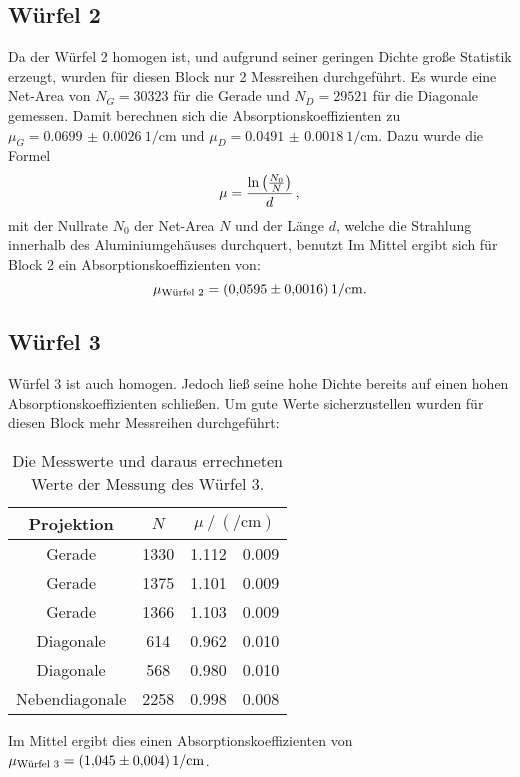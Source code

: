  \subsection{Würfel 2}
    Da der Würfel 2 homogen ist, und aufgrund seiner geringen Dichte große Statistik erzeugt, wurden für diesen Block nur 2 Messreihen durchgeführt.
    Es wurde eine Net-Area von $N_G=30323$ für die Gerade und $N_D=29521$ für die Diagonale gemessen.
    Damit berechnen sich die Absorptionskoeffizienten zu $\mu_G = \SI{0.0699(00026)}{1\per\centi\metre}$ und $\mu_D=\SI{0.0491(00018)}{1\per\centi\metre}$.
    Dazu wurde die Formel
    \begin{equation}
      \mu = \frac{\t{ln}\left(\frac{N_0}{N}\right)}{d} \, ,
    \end{equation}
    mit der Nullrate $N_0$ der Net-Area $N$ und der Länge $d$, welche die Strahlung innerhalb des Aluminiumgehäuses durchquert, benutzt
    Im Mittel ergibt sich für Block 2 ein Absorptionskoeffizienten von: 
    \begin{equation}
      \mu_\t{Würfel 2} = \SI{0.0595(00016)}{1\per\centi\metre}.
    \end{equation}

  \subsection{Würfel 3}
    Würfel 3 ist auch homogen. Jedoch ließ seine hohe Dichte bereits auf einen hohen Absorptionskoeffizienten schließen. 
    Um gute Werte sicherzustellen wurden für diesen Block mehr Messreihen durchgeführt:
    \begin{table}[H]
     \centering
     \caption{Die Messwerte und daraus errechneten Werte der Messung des Würfel 3.}
     \label{tab:w2}
     \begin{tabular}{c S[table-format=4.0] S[table-format=1.3] @{${}\pm{}$} S[table-format=1.3]}
       \toprule
       {Projektion} &  &  \\
       \midrule
       Gerade & 1330 & 1.112 & 0.009 \\
       Gerade & 1375 & 1.101 & 0.009 \\
       Gerade & 1366 & 1.103 & 0.009 \\
       Diagonale & 614 & 0.962 & 0.010 \\
       Diagonale & 568 & 0.980 & 0.010 \\
       Nebendiagonale & 2258 & 0.998 & 0.008 \\
       \bottomrule  
     \end{tabular}
    \end{table} 
    \noindent
    Im Mittel ergibt dies einen Absorptionskoeffizienten von $\mu_\t{Würfel 3} = \SI{1.045(0004)}{1\per\centi\metre}$.

